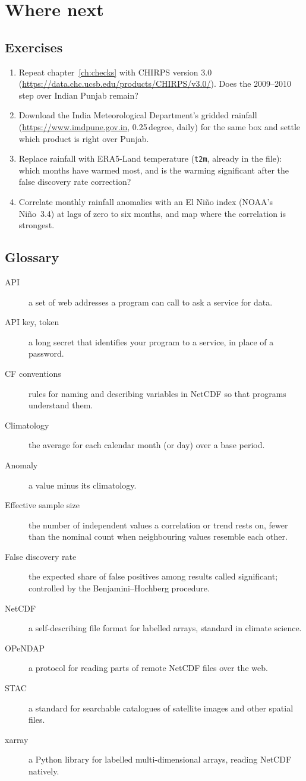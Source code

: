 \chapter{Where next}\label{ch:next}

\section{Exercises}
\begin{enumerate}
\item Repeat chapter~\ref{ch:checks} with CHIRPS version 3.0 (\url{https://data.chc.ucsb.edu/products/CHIRPS/v3.0/}). Does the 2009--2010 step over Indian Punjab remain?
\item Download the India Meteorological Department's gridded rainfall (\url{https://www.imdpune.gov.in}, 0.25\,degree, daily) for the same box and settle which product is right over Punjab.
\item Replace rainfall with ERA5-Land temperature (\texttt{t2m}, already in the file): which months have warmed most, and is the warming significant after the false discovery rate correction?
\item Correlate monthly rainfall anomalies with an El Ni\~no index (NOAA's Ni\~no~3.4) at lags of zero to six months, and map where the correlation is strongest.
\end{enumerate}

\section{Glossary}
\begin{description}
\item[API] a set of web addresses a program can call to ask a service for data.
\item[API key, token] a long secret that identifies your program to a service, in place of a password.
\item[CF conventions] rules for naming and describing variables in NetCDF so that programs understand them.
\item[Climatology] the average for each calendar month (or day) over a base period.
\item[Anomaly] a value minus its climatology.
\item[Effective sample size] the number of independent values a correlation or trend rests on, fewer than the nominal count when neighbouring values resemble each other.
\item[False discovery rate] the expected share of false positives among results called significant; controlled by the Benjamini--Hochberg procedure.
\item[NetCDF] a self-describing file format for labelled arrays, standard in climate science.
\item[OPeNDAP] a protocol for reading parts of remote NetCDF files over the web.
\item[STAC] a standard for searchable catalogues of satellite images and other spatial files.
\item[xarray] a Python library for labelled multi-dimensional arrays, reading NetCDF natively.
\end{description}

